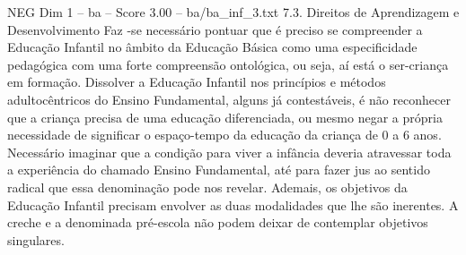 \begin{textsample}{NEG Dim 1 – ba – Score 3.00 – ba/ba\_inf\_3.txt}  \label{ex:f1_neg_185}
7.3.
Direitos de Aprendizagem e Desenvolvimento Faz -se necessário pontuar que é preciso se compreender a Educação Infantil no âmbito da Educação Básica como uma especificidade pedagógica com uma forte compreensão ontológica, ou seja, aí está o ser-criança em formação.
Dissolver a Educação Infantil nos princípios e métodos adultocêntricos do Ensino Fundamental, alguns já contestáveis, é não reconhecer que a criança precisa de uma educação diferenciada, ou mesmo negar a própria necessidade de significar o espaço-tempo da educação da criança de 0 a 6 anos.
Necessário imaginar que a condição para viver a infância deveria atravessar toda a experiência do chamado Ensino Fundamental, até para fazer jus ao sentido radical que essa denominação pode nos revelar.
Ademais, os objetivos da Educação Infantil precisam envolver as duas modalidades que lhe são inerentes.
A creche e a denominada pré-escola não podem deixar de contemplar objetivos singulares.

\end{textsample}

